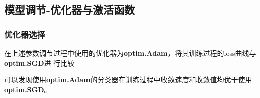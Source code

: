 \documentclass{article}
\begin{document}
\subsection{模型调节-优化器与激活函数}
\subsubsection{优化器选择}
在上述参数调节过程中使用的优化器为\textbf{optim.Adam}，将其训练过程的loss曲线与\textbf{optim.SGD}进
行比较
\begin{figure}[h!]
    \centering
        
\end{figure}


可以发现使用\textbf{optim.Adam}的分类器在训练过程中收敛速度和收敛值均优于使用\textbf{optim.SGD}。
 
\end{document}
